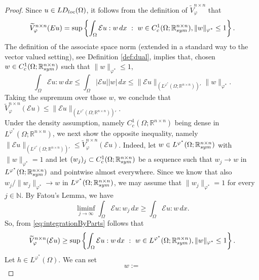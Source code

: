 \documentclass[10pt,a4paper]{amsart}
\def\N{\mathbb{N}}
\def\R{\mathbb{R}}
\def\loc{{\rm loc}}
\def\sym{{\rm sym}}
\newcommand{\E}{\mathcal{E}}
\newcommand{\st}{ \ : \ }
\newcommand{\vphi}{\varphi}
\begin{document}
\begin{proof}
    Since $u \in LD_\loc(\Omega)$, it follows from the definition of $\widetilde{V}^{n \times n}_\vphi$ that 
    \begin{equation}
    \label{eq:integrationByParts}
        \widetilde{V}^{n \times n}_\vphi(Eu) = \sup \left\{ \int_\Omega \E u : w \, dx \st w \in C^1_c(\Omega; \R^{n \times n}_\sym), \|w\|_{\vphi^*} \le 1 \right\}. 
    \end{equation}
    The definition of the associate space norm (extended in a standard way to the vector valued setting), see Definition \ref{def:dual}, implies that, chosen $w \in C^1_c(\Omega; \R^{n \times n}_\sym)$ such that $\|w\|_{\vphi^*} \le 1$,
    \begin{equation*}
        \int_\Omega \E u : w \, dx \le \int_\Omega |\E u| |w| \, dx \le \| \E u\|_{(L^{\vphi^*}(\Omega;\R^{n \times n}))'} \|w\|_{\vphi^*}.
    \end{equation*}
    Taking the supremum over those $w$, we conclude that $\widetilde{V}^{n \times n}_\vphi(\E u) \le \|\E u\|_{(L^{\vphi^*}(\Omega;\R^{n \times n}))'}$. 
    \\
    Under the density assumption, namely $C^1_c(\Omega;\R^{n \times n})$ being dense in $L^{\vphi^*}(\Omega;\R^{n \times n})$, we next show the opposite inequality, namely $ \|\E u\|_{(L^{\vphi^*}(\Omega;\R^{n \times n}))'} \le \widetilde{V}^{n \times n}_\vphi(\E u)$. Indeed, let $w \in L^{\vphi^*}(\Omega; \R^{n \times n}_\sym)$ with $\|w\|_{\vphi^*} = 1$ and let $(w_j)_j \subset C^1_c(\Omega; \R^{n \times n}_\sym)$ be a sequence such that $w_j \to w$ in $L^{\vphi^*}(\Omega; \R^{n \times n}_\sym)$ and pointwise almost everywhere. Since we know that also $w_j/\|w_j\|_{\vphi^*} \to w$ in $L^{\vphi^*}(\Omega; \R^{n \times n}_\sym)$, we may assume that $\|w_j\|_{\vphi^*} = 1$ for every $j \in \N$. By Fatou's Lemma, we have
    \begin{equation*}
        \liminf_{j \to \infty} \int_\Omega \E u : w_j \, dx \ge \int_\Omega \E u : w \, dx.
    \end{equation*}
    So, from \eqref{eq:integrationByParts} follows that 
    \begin{equation*}
        \widetilde{V}^{n \times n}_\vphi(\E u) \ge \sup \left\{ \int_\Omega \E u : w \, dx \st w \in L^{\vphi^*}(\Omega; \R^{n \times n}_\sym), \| w\|_{\vphi^*} \le 1 \right\}.
    \end{equation*}
    Let $h\in L^{\vphi^*}(\Omega)$. We can set
    \begin{equation*}
        w :=

\end{equation*}
\end{proof}
\end{document}
